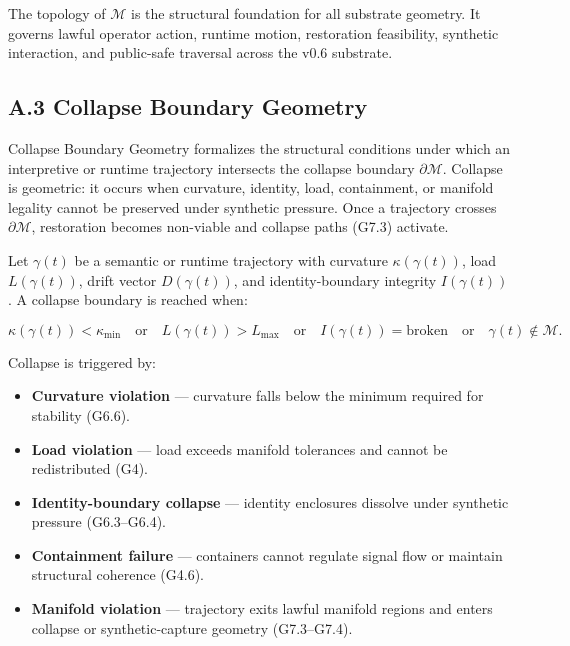 \medskip

\noindent The topology of $\mathcal{M}$ is the structural foundation for all
substrate geometry. It governs lawful operator action, runtime motion, restoration
feasibility, synthetic interaction, and public-safe traversal across the v0.6
substrate.


\subsection*{A.3 Collapse Boundary Geometry}

\noindent Collapse Boundary Geometry formalizes the structural conditions under
which an interpretive or runtime trajectory intersects the collapse boundary
$\partial \mathcal{M}$. Collapse is geometric: it occurs when curvature,
identity, load, containment, or manifold legality cannot be preserved under
synthetic pressure. Once a trajectory crosses $\partial \mathcal{M}$, restoration
becomes non-viable and collapse paths (G7.3) activate.

\medskip

\noindent Let $\gamma(t)$ be a semantic or runtime trajectory with curvature
$\kappa(\gamma(t))$, load $L(\gamma(t))$, drift vector $D(\gamma(t))$, and
identity-boundary integrity $I(\gamma(t))$. A collapse boundary is reached when:



\[
\kappa(\gamma(t)) < \kappa_{\min}
\quad \text{or} \quad
L(\gamma(t)) > L_{\max}
\quad \text{or} \quad
I(\gamma(t)) = \text{broken}
\quad \text{or} \quad
\gamma(t) \notin \mathcal{M}.
\]



\medskip

\noindent Collapse is triggered by:

\begin{itemize}
    \item \textbf{Curvature violation} — curvature falls below the minimum
    required for stability (G6.6).

    \item \textbf{Load violation} — load exceeds manifold tolerances and cannot
    be redistributed (G4).

    \item \textbf{Identity-boundary collapse} — identity enclosures dissolve
    under synthetic pressure (G6.3--G6.4).

    \item \textbf{Containment failure} — containers cannot regulate signal flow
    or maintain structural coherence (G4.6).

    \item \textbf{Manifold violation} — trajectory exits lawful manifold regions
    and enters collapse or synthetic-capture geometry (G7.3--G7.4).
\end{itemize}

